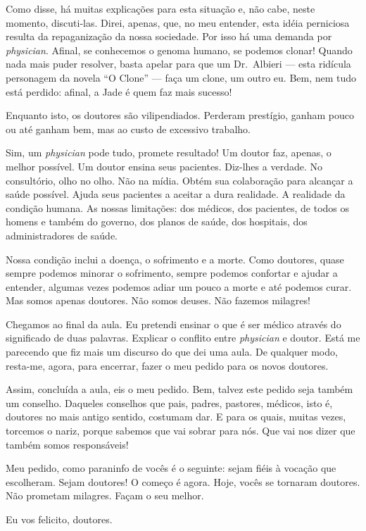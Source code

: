 \documentclass[pdftex, brazil, 12pt, oneside]{article}
\newcommand{\ingles}[1]{\textit{#1}}
\begin{document}
Como disse, há muitas explicações para esta situação e, não cabe, neste momento, discuti-las.
Direi, apenas, que, no meu entender, esta idéia perniciosa resulta da repaganização da nossa sociedade.
Por isso há uma demanda por \ingles{physician}. Afinal, se conhecemos o genoma humano, se podemos clonar!
Quando nada mais puder resolver, basta apelar para que um Dr.\ Albieri --- esta ridícula personagem da novela
``O Clone'' --- faça um clone, um outro eu. Bem, nem tudo está perdido: afinal, a Jade é quem faz mais sucesso!

Enquanto isto, os doutores são vilipendiados. Perderam prestígio, ganham pouco ou até ganham bem,
mas ao custo de excessivo trabalho.

Sim, um \ingles{physician} pode tudo, promete resultado! Um doutor faz, apenas, o melhor possível.
Um doutor ensina seus pacientes. Diz-lhes a verdade. No consultório, olho no olho. Não na mídia.
Obtém sua colaboração para alcançar a saúde possível. Ajuda seus pacientes a aceitar a dura realidade.
A realidade da condição humana. As nossas limitações: dos médicos, dos pacientes, de todos os homens
e também do governo, dos planos de saúde, dos hospitais, dos administradores de saúde.

Nossa condição inclui a doença, o sofrimento e a morte. Como doutores, quase sempre podemos minorar
o sofrimento, sempre podemos confortar e ajudar a entender, algumas vezes podemos adiar um pouco a morte
e até podemos curar. Mas somos apenas doutores. Não somos deuses. Não fazemos milagres!

Chegamos ao final da aula. Eu pretendi ensinar o que é ser médico através do significado de duas palavras.
Explicar o conflito entre \ingles{physician} e doutor. Está me parecendo que fiz mais um discurso do
que dei uma aula. De qualquer modo, resta-me, agora, para encerrar, fazer o meu pedido para os novos doutores.

Assim, concluída a aula, eis o meu pedido.
Bem, talvez este pedido seja também um conselho. Daqueles conselhos que pais, padres, pastores, médicos,
isto é, doutores no mais antigo sentido, costumam dar. E para os quais, muitas vezes, torcemos o nariz,
porque sabemos que vai sobrar para nós. Que vai nos dizer que também somos responsáveis!

Meu pedido, como paraninfo de vocês é o seguinte: sejam fiéis à vocação que escolheram. Sejam doutores!
O começo é agora. Hoje, vocês se tornaram doutores. Não prometam milagres. Façam o seu melhor.

Eu vos felicito, doutores.
\end{document}
